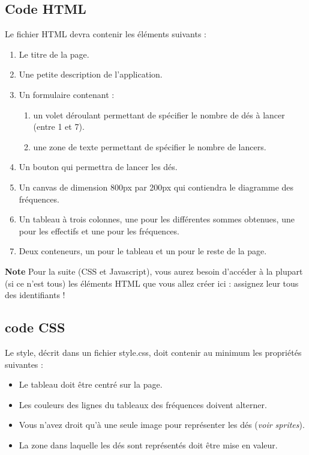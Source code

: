 \documentclass[10pt,french,A4]{article}
\theoremstyle{plain}
\begin{document}
\subsection{Code HTML}
Le fichier HTML devra contenir les éléments suivants :
\begin{enumerate}
    \item Le titre de la page.
    \item Une petite description de l'application.
    \item Un formulaire contenant :
    \begin{enumerate}
        \item un volet déroulant permettant de spécifier le nombre de dés à lancer (entre 1 et 7).
        \item une zone de texte permettant de spécifier le nombre de lancers.
    \end{enumerate}
    \item Un bouton qui permettra de lancer les dés.
    \item Un canvas de dimension 800px par 200px qui contiendra le diagramme des fréquences. 
    \item Un tableau à trois colonnes, une pour les différentes sommes obtenues, une pour les effectifs et une pour les fréquences.
    \item Deux conteneurs, un pour le tableau et un pour le reste de la page.
\end{enumerate}
\textbf{Note} Pour la suite (CSS et Javascript), vous aurez besoin d'accéder à la plupart (si ce n'est tous) les
éléments HTML que vous allez créer ici : assignez leur tous des identifiants !

\subsection{code CSS}
Le style, décrit dans un fichier style.css, doit contenir au minimum les propriétés suivantes :
\begin{itemize}
    \item Le tableau doit être centré sur la page.
    \item Les couleurs des lignes du tableaux des fréquences doivent alterner. 
    \item Vous n'avez droit qu'à une seule image pour représenter les dés (\textit{voir sprites}).
    \item La zone dans laquelle les dés sont représentés doit être mise en valeur.
\end{itemize}
\end{document}
